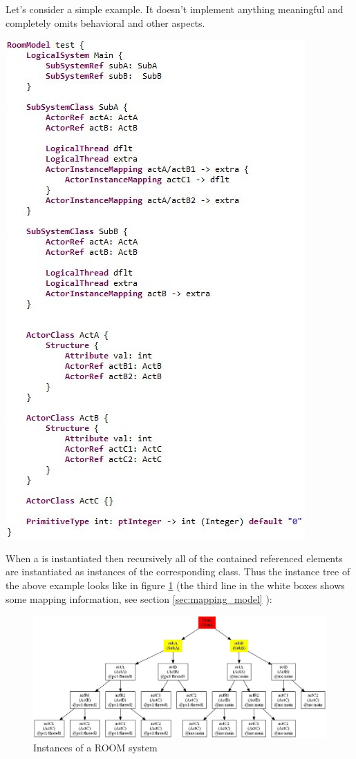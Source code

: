 Let's consider a simple example. It doesn't implement anything meaningful and completely omits behavioral and 
other aspects.

\includegraphics{images/080-room.jpg}

When a  is instantiated then recursively all of the contained referenced elements are 
instantiated as instances of the corresponding class. Thus the instance tree of the above example looks like 
in figure \ref{fig:instance_tree} (the third line in the white boxes shows some mapping information,
see section \ref{sec:mapping_model} ):

\begin{figure}
\includegraphics[scale=0.45]{images/080-instances.jpg}
\caption{Instances of a ROOM system}
\label{fig:instance_tree}
\end{figure}

